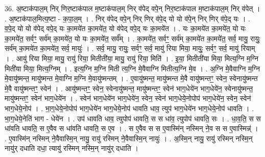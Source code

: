 \documentclass[17pt]{extarticle}
\begin{document}
36. अ॒ष्टाक॑पाल॒म् निर् णिर॒ष्टाक॑पाल म॒ष्टाक॑पाल॒म् निर् व॑पेद् वपे॒न् निर॒ष्टाक॑पाल म॒ष्टाक॑पाल॒म् निर् व॑पेत् । . अ॒ष्टाक॑पाल॒मित्य॒ष्टा - क॒पा॒ल॒म् । . निर् व॑पेद् वपे॒न् निर् णिर् व॑पे॒द् यो यो व॑पे॒न् निर् णिर् व॑पे॒द् यः । . व॒पे॒द् यो यो व॑पेद् वपे॒द् यः का॒मये॑त का॒मये॑त॒ यो व॑पेद् वपे॒द् यः का॒मये॑त । . यः का॒मये॑त का॒मये॑त॒ यो यः का॒मये॑त॒ सर्वꣳ॒॒ सर्व॑म् का॒मये॑त॒ यो यः का॒मये॑त॒ सर्व᳚म् । . का॒मये॑त॒ सर्वꣳ॒॒ सर्व॑म् का॒मये॑त का॒मये॑त॒ सर्व॒ मायु॒ रायुः॒ सर्व॑म् का॒मये॑त का॒मये॑त॒ सर्व॒ मायुः॑ । . सर्व॒ मायु॒ रायुः॒ सर्वꣳ॒॒ सर्व॒ मायु॑ रिया मिया॒ मायुः॒ सर्वꣳ॒॒ सर्व॒ मायु॑ रियाम् । . आयु॑ रिया मिया॒ मायु॒ रायु॑ रिया॒ मितीती॑या॒ मायु॒ रायु॑ रिया॒ मिति॑ । . इ॒या॒ मितीती॑या मिया॒ मित्य॒ग्नि म॒ग्नि मिती॑या मिया॒ मित्य॒ग्निम् । . इत्य॒ग्नि म॒ग्नि मिती त्य॒ग्नि मे॒वैवाग्नि मितीत्य॒ग्नि मे॒व । . अ॒ग्नि मे॒वैवाग्नि म॒ग्नि मे॒वायु॑ष्मन्त॒ मायु॑ष्मन्त मे॒वाग्नि म॒ग्नि मे॒वायु॑ष्मन्तम् । . ए॒वायु॑ष्मन्त॒ मायु॑ष्मन्त मे॒वै वायु॑ष्मन्तꣳ॒॒ स्वेन॒ स्वेनायु॑ष्मन्त मे॒वै वायु॑ष्मन्तꣳ॒॒ स्वेन॑ । . आयु॑ष्मन्तꣳ॒॒ स्वेन॒ स्वेनायु॑ष्मन्त॒ मायु॑ष्मन्तꣳ॒॒ स्वेन॑ भाग॒धेये॑न भाग॒धेये॑न॒ स्वेनायु॑ष्मन्त॒ मायु॑ष्मन्तꣳ॒॒ स्वेन॑ भाग॒धेये॑न । . स्वेन॑ भाग॒धेये॑न भाग॒धेये॑न॒ स्वेन॒ स्वेन॑ भाग॒धेये॒नोपोप॑ भाग॒धेये॑न॒ स्वेन॒ स्वेन॑ भाग॒धेये॒नोप॑ । . भा॒ग॒धेये॒नोपोप॑ भाग॒धेये॑न भाग॒धेये॒नोप॑ धावति धाव॒ त्युप॑ भाग॒धेये॑न भाग॒धेये॒नोप॑ धावति । . भा॒ग॒धेये॒नेति॑ भाग - धेये॑न । . उप॑ धावति धाव॒ त्युपोप॑ धावति॒ स स धा॑व॒ त्युपोप॑ धावति॒ सः । . धा॒व॒ति॒ स स धा॑वति धावति॒ स ए॒वैव स धा॑वति धावति॒ स ए॒व । . स ए॒वैव स स ए॒वास्मि॑न् नस्मिन् ने॒व स स ए॒वास्मिन्न्॑ । . ए॒वास्मि॑न् नस्मिन् ने॒वैवास्मि॒न् नायु॒ रायु॑ रस्मिन् ने॒वैवास्मि॒न् नायुः॑ । . अ॒स्मि॒न् नायु॒ रायु॑ रस्मिन् नस्मि॒न् नायु॑र् दधाति दधा॒ त्यायु॑ रस्मिन् नस्मि॒न् नायु॑र् दधाति । \newline
\pagebreak
{}
\end{document}
